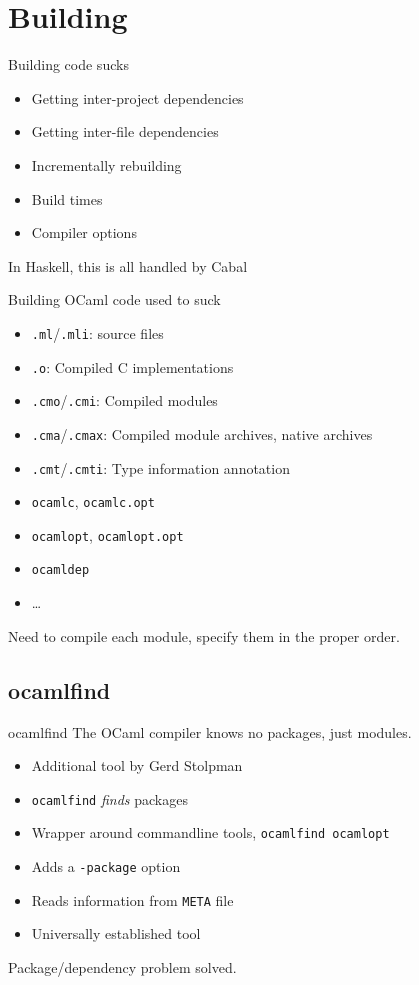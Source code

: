 \documentclass{beamer}
\begin{document}
\section{Building}

\begin{frame}{Building code sucks}
  \begin{itemize}
    \item Getting inter-project dependencies
    \item Getting inter-file dependencies
    \item Incrementally rebuilding
    \item Build times
    \item Compiler options
  \end{itemize}
  In Haskell, this is all handled by Cabal
\end{frame}

\begin{frame}{Building OCaml code used to suck}
  \begin{itemize}
    \item \texttt{.ml}/\texttt{.mli}: source files
    \item \texttt{.o}: Compiled C implementations
    \item \texttt{.cmo}/\texttt{.cmi}: Compiled modules
    \item \texttt{.cma}/\texttt{.cmax}: Compiled module archives, native archives
    \item \texttt{.cmt}/\texttt{.cmti}: Type information annotation
  \end{itemize}
  \begin{itemize}
    \item \texttt{ocamlc}, \texttt{ocamlc.opt}
    \item \texttt{ocamlopt}, \texttt{ocamlopt.opt}
    \item \texttt{ocamldep}
    \item …
  \end{itemize}
  Need to compile each module, specify them in the proper order.
\end{frame}

\subsection{ocamlfind}

\begin{frame}{ocamlfind}
  The OCaml compiler knows no packages, just modules.
  \begin{itemize}
    \item Additional tool by Gerd Stolpman
    \item \texttt{ocamlfind} \emph{finds} packages
    \item Wrapper around commandline tools, \texttt{ocamlfind ocamlopt}
    \item Adds a \texttt{-package} option
    \item Reads information from \texttt{META} file
    \item Universally established tool
  \end{itemize}
  Package/dependency problem solved.
\end{frame}
\end{document}
